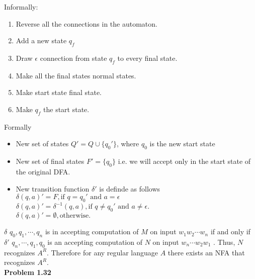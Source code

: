 \documentclass{article}
\newcommand{\problem}[1]{\large{\textbf{Problem #1} \\}}
\begin{document}
{{{Informally:
\begin{enumerate}[1., leftmargin = 0.5cm, nosep]
\item Reverse all the connections in the automaton.
\item Add a new state $q_f$
\item Draw $\epsilon$ connection from state $q_f$ to every final state.
\item Make all the final states normal states.
\item Make start state final state.
\item Make $q_f$ the start state. \\
\end{enumerate}
Formally
\begin{itemize}
\item New set of states $Q' = Q \cup \{q_0'\}$, where $q_0$ is the new start state
\item New set of final states $F' = \{q_0\}$ 
i.e. we will accept only in the start state of the original DFA.
\item New transition function $\delta'$ is definde as follows\\
  $\delta(q,a) '= F, \text{if } q = q_0' \text{ and } a = \epsilon$ \\
  $\delta(q,a) '= \delta^{-1}(q,a),  \text{if } q \neq q_0' \text{ and } a \neq \epsilon .$ \\
  $\delta(q,a) ' =  \emptyset,  \text{otherwise}.$

\end{itemize}
$\delta$ $q_0, q_1, \cdots, q_n$ is in accepting computation of $M$ on input $w_1w_2\cdots w_n$ if
and only if $\delta'$ $q_n,\cdots ,q_1, q_0 $ is an accepting computation of $N$ on input $w_n \cdots w_2 w_1$ . 
Thus, $N$ recognizes $A^R$. Therefore for any regular language $A$ there exists an NFA that recognizes
$A^R$.\\

\vspace{1cm}
\problem{1.32}

}}}
\end{document}
